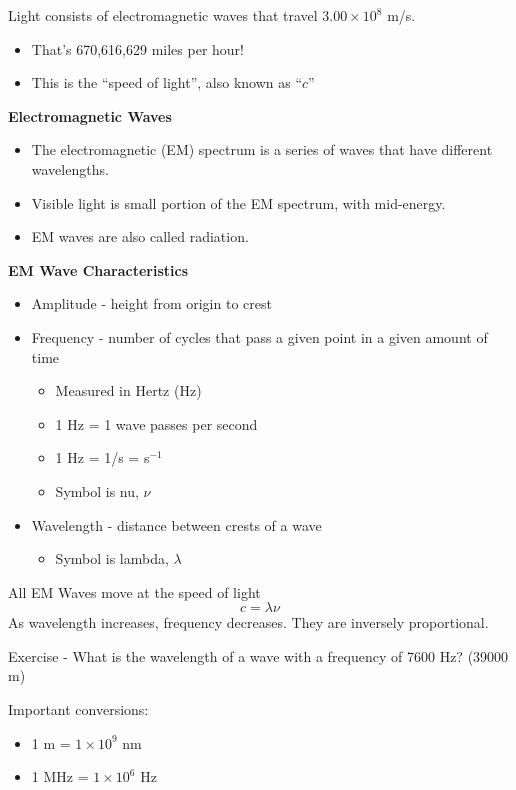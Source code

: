 \documentclass[../hchem.tex]{subfiles}
\begin{document}
Light consists of electromagnetic waves that travel $3.00\times 10^8$ m/s.
\begin{itemize}
    \item That's 670,616,629 miles per hour! 
    \item This is the ``speed of light'', also known as ``$c$''
\end{itemize}

\textbf{Electromagnetic Waves}
\begin{itemize}
    \item The electromagnetic (EM) spectrum is a series of waves that have different wavelengths.
    \item Visible light is small portion of the EM spectrum, with mid-energy.
    \item EM waves are also called radiation.
\end{itemize}

\textbf{EM Wave Characteristics}
\begin{itemize}
    \item Amplitude - height from origin to crest
    \item Frequency - number of cycles that pass a given point in a given amount of time 
    \begin{itemize}
        \item Measured in Hertz (Hz)
        \item 1 Hz = 1 wave passes per second 
        \item 1 Hz = 1/s = s$^{-1}$
        \item Symbol is nu, $\nu$
    \end{itemize}
    \item Wavelength - distance between crests of a wave 
    \begin{itemize}
        \item Symbol is lambda, $\lambda$
    \end{itemize} 
\end{itemize}

All EM Waves move at the speed of light 
\[c=\lambda \nu\]
As wavelength increases, frequency decreases. They are inversely proportional.

Exercise - What is the wavelength of a wave with a frequency of 7600 Hz? (39000 m)

Important conversions:
\begin{itemize}
    \item 1 m = $1\times10^9$ nm 
    \item 1 MHz = $1\times 10^6$ Hz 
\end{itemize}
\end{document}
